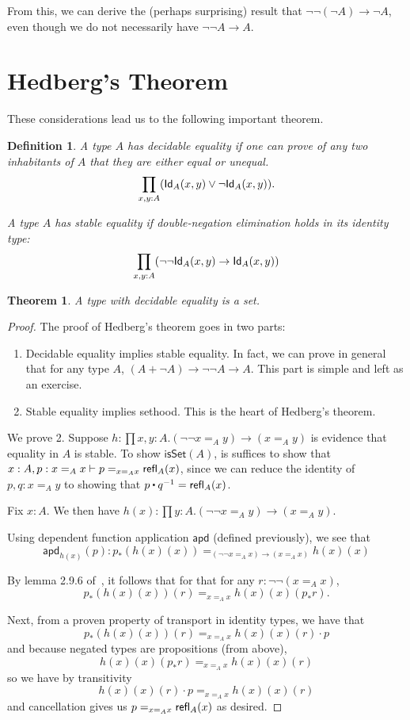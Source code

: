 \documentclass[11pt]{article}
\newcommand*{\apd}{\mathsf{apd}}
\newcommand*{\isSet}{\mathsf{isSet}}
\newtheorem{thm}{Theorem}
\newtheorem{defn}{Definition}
\begin{document}
From this, we can derive the (perhaps surprising) result that $\neg\neg (\neg A)\to \neg A$,
even though we do not necessarily have $\neg\neg A \to A$.

\section{Hedberg's Theorem}
These considerations lead us to the following important theorem.

\begin{defn}
 A type $A$ has \emph{decidable equality} if one can prove of any two inhabitants of $A$ 
 that they are either equal or unequal.
 $$\prod_{x,y:A}(\mathsf{Id}_{A}(x,y)\vee \neg \mathsf{Id}_{A}(x,y)).$$
 
 A type $A$ has \emph{stable equality} if double-negation elimination holds in its identity type:
 $$\prod_{x,y:A}(\neg\neg \mathsf{Id}_{A}(x,y)\to \mathsf{Id}_{A}(x,y))$$
\end{defn}

\begin{thm}
 A type with decidable equality is a set.
\end{thm}
\begin{proof}
 
 The proof of Hedberg's theorem goes in two parts:
 \begin{enumerate}
  \item Decidable equality implies stable equality. In fact, we can prove in general that for 
  any type $A$, $(A+\neg A)\to \neg\neg A \to A$. This part is simple and left as an exercise.
  
  \item Stable equality implies sethood. This is the heart of Hedberg's theorem.
 \end{enumerate}
 
 We prove 2. Suppose $h:\prod x,y:A.(\neg \neg x=_A y)\to (x=_Ay)$ is evidence
 that equality in $A$ is stable.  To show $\isSet(A)$, is suffices to show that
 $x:A, p:x=_A x\vdash p=_{x=_A x} \mathsf{refl}_{A}(x)$, since we can reduce the
 identity of $p,q:x=_A y$ to showing that $p \concat q^{-1} = \refl{A}(x)$.
 
 Fix $x:A$. We then have $h(x):\prod y:A.(\neg\neg x=_A y)\to(x=_A y)$.
 
 Using dependent function application $\apd$ (defined previously), we see that
 $$\apd_{h(x)}(p): p_*(h(x)(x))=_{(\neg\neg x=_A x)\to(x=_A x)}h(x)(x)$$

 By lemma 2.9.6 of~\cite{HoTTBook2013}, it follows that for that for any $r:\neg\neg(x=_A x)$,
 $$ p_*(h(x)(x))(r)=_{x=_A x} h(x)(x)(p_* r). $$

 Next, from a proven property of transport in identity types, we have that
 $$ p_*(h(x)(x))(r) =_{x=_A x} h(x)(x)(r)\cdot p $$ %
 and because negated types are propositions (from above),
 $$ h(x)(x)(p_* r) =_{x=_A x} h(x)(x)(r)$$
 so we have by transitivity
 $$ h(x)(x)(r)\cdot p =_{x=_A x} h(x)(x)(r) $$
 and cancellation gives us $p =_{x=_A x} \mathsf{refl}_{A}(x)$ as desired.
\end{proof}
\end{document}
